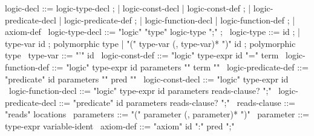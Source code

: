 \begin{syntax}
  logic-decl ::= logic-type-decl ;
          | logic-const-decl | logic-const-def ;
          | logic-predicate-decl | logic-predicate-def ;
          | logic-function-decl | logic-function-def ;
          | axiom-def
  \
  logic-type-decl ::= "logic" "type" logic-type ";" ; 
  \
  logic-type ::= id ;
  | type-var id ; polymorphic type
  | "(" type-var (, type-var)* ")" id ; polymorphic type
  \
  type-var ::= "'" id 
  \
  logic-const-def ::= "logic" type-expr id "=" term
  \
  logic-function-def ::= "logic" type-expr id parameters "{" term "}"
  \
  logic-predicate-def ::= "predicate" id parameters "{" pred "}"
  \
  logic-const-decl ::= "logic" type-expr id 
  \
  logic-function-decl ::= "logic" type-expr id parameters reads-clause? ";"
  \
  logic-predicate-decl ::= "predicate" id parameters reads-clause? ";"
  \
  reads-clause ::= "reads" locations
  \
  parameters ::= "(" parameter (, parameter)* ")"
  \
  parameter ::= type-expr variable-ident  
  \
  axiom-def ::= "axiom" id ":" pred ";"
\end{syntax}
